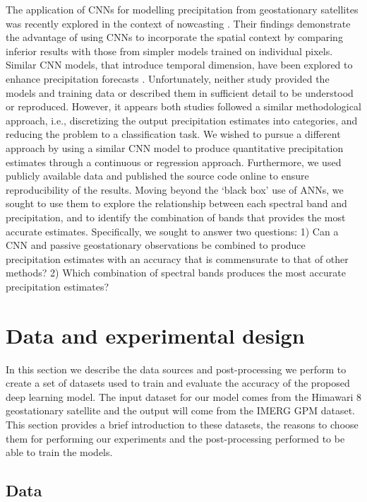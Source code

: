 \documentclass[3p,times]{elsarticle}
\begin{document}
The application of CNNs for modelling precipitation from geostationary satellites was recently explored in the context of nowcasting \citep{lebedev2019precipitation}. Their findings demonstrate the advantage of using CNNs to incorporate the spatial context by comparing inferior results with those from simpler models trained on individual pixels. Similar CNN models, that introduce temporal dimension, have been explored to enhance precipitation forecasts \citep{sonderby2020metnet}. Unfortunately, neither study provided the models and training data or described them in sufficient detail to be understood or reproduced. However, it appears both studies followed a similar methodological approach, i.e., discretizing the output precipitation estimates into categories, and reducing the problem to a classification task. 
We wished to pursue a different approach by using a similar CNN model to produce quantitative precipitation estimates through a continuous or regression approach. Furthermore, we used publicly available data and published the source code online to ensure reproducibility of the results. Moving beyond the ‘black box’ use of ANNs, we sought to use them to explore the relationship between each spectral band and precipitation, and to identify the combination of bands that provides the most accurate estimates. Specifically, we sought to answer two questions: 
1) Can a CNN and passive geostationary observations be combined to produce precipitation estimates with an accuracy that is commensurate to that of other methods?
2) Which combination of spectral bands produces the most accurate precipitation estimates?



\section{Data and experimental design}

In this section we describe the data sources and post-processing we perform to create a set of datasets used to train and evaluate the accuracy of the proposed deep learning model. The input dataset for our model comes from the Himawari 8 geostationary satellite and the output will come from the IMERG GPM dataset. This section provides a brief introduction to these datasets, the reasons to choose them for performing our experiments and the post-processing performed to be able to train the models.

\subsection{Data}
\end{document}
